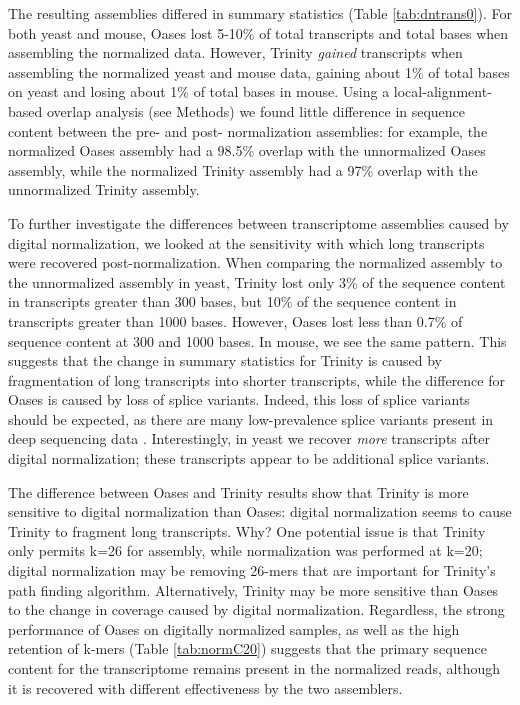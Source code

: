 The resulting assemblies differed in summary statistics (Table
\ref{tab:dntrans0}).  For both yeast and mouse, Oases lost 5-10\% of
total transcripts and total bases when assembling the normalized data.  However, Trinity {\em gained}
transcripts when assembling the normalized yeast and mouse data,
gaining about 1\% of total bases on yeast and losing about 1\%
of total bases in mouse.  Using a local-alignment-based overlap
analysis (see Methods) we found little difference in sequence
content between the pre- and post- normalization assemblies: for
example, the normalized Oases assembly had a 98.5\% overlap with the
unnormalized Oases assembly, while the normalized Trinity assembly had
a 97\% overlap with the unnormalized Trinity assembly.

To further investigate the differences between transcriptome
assemblies caused by digital normalization, we looked at the
sensitivity with which long transcripts were recovered
post-normalization.  When comparing the normalized assembly to the
unnormalized assembly in yeast, Trinity lost only 3\% of the sequence
content in transcripts greater than 300 bases, but 10\% of the
sequence content in transcripts greater than 1000 bases.  However,
Oases lost less than 0.7\% of sequence content at 300 and
1000 bases.  In mouse, we see the same pattern.
This suggests that the change in summary statistics for
Trinity is caused by fragmentation of long transcripts into shorter
transcripts, while the difference for Oases is caused by loss of
splice variants.  Indeed, this
loss of splice variants should be expected, as there are many low-prevalence splice
variants present in deep sequencing data \cite{pubmed21151575}.
Interestingly, in yeast we recover {\em more} transcripts after
digital normalization; these transcripts appear to be additional splice
variants.


The difference between Oases and Trinity results show that Trinity is
more sensitive to digital normalization than Oases: digital
normalization seems to cause Trinity to fragment long transcripts.
Why?  One potential issue is that Trinity only permits k=26 for
assembly, while normalization was performed at k=20; digital
normalization may be removing 26-mers that are important for Trinity's
path finding algorithm.  Alternatively, Trinity may be more sensitive
than Oases to the change in coverage caused by digital normalization.
Regardless, the strong performance of Oases on digitally normalized
samples, as well as the high retention of k-mers (Table \ref{tab:normC20})
suggests that the primary sequence content for the transcriptome remains
present in the normalized reads, although it is recovered with different
effectiveness by the two assemblers.


